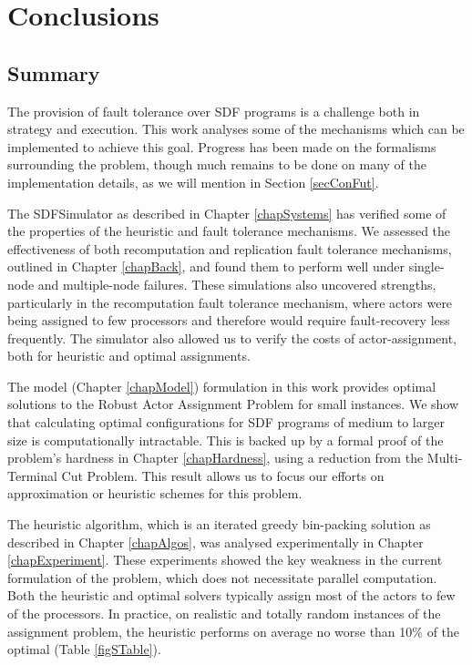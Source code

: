 \chapter{Conclusions}
\label{chapConclusion}

\section{Summary}
\label{secConSum}

The provision of fault tolerance over SDF programs is a challenge both in strategy and execution.
This work analyses some of the mechanisms which can be implemented to achieve this goal.
Progress has been made on the formalisms surrounding the problem, though much remains to be done on many of the implementation details, as we will mention in Section \ref{secConFut}.

The SDFSimulator as described in Chapter \ref{chapSystems} has verified some of the properties of the heuristic and fault tolerance mechanisms.
We assessed the effectiveness of both recomputation and replication fault tolerance mechanisms, outlined in Chapter \ref{chapBack}, and found them to perform well under single-node and multiple-node failures.
These simulations also uncovered strengths, particularly in the recomputation fault tolerance mechanism, where actors were being assigned to few processors and therefore would require fault-recovery less frequently.
The simulator also allowed us to verify the costs of actor-assignment, both for heuristic and optimal assignments.

The model (Chapter \ref{chapModel}) formulation in this work provides optimal solutions to the Robust Actor Assignment Problem for small instances.
We show that calculating optimal configurations for SDF programs of medium to larger size is computationally intractable.
This is backed up by a formal proof of the problem's hardness in Chapter \ref{chapHardness}, using a reduction from the Multi-Terminal Cut Problem.
This result allows us to focus our efforts on approximation or heuristic schemes for this problem.

The heuristic algorithm, which is an iterated greedy bin-packing solution as described in Chapter \ref{chapAlgos}, was analysed experimentally in Chapter \ref{chapExperiment}.
These experiments showed the key weakness in the current formulation of the problem, which does not necessitate parallel computation.
Both the heuristic and optimal solvers typically assign most of the actors to few of the processors.
In practice, on realistic and totally random instances of the assignment problem, the heuristic performs on average no worse than 10\% of the optimal (Table \ref{figSTable}).

